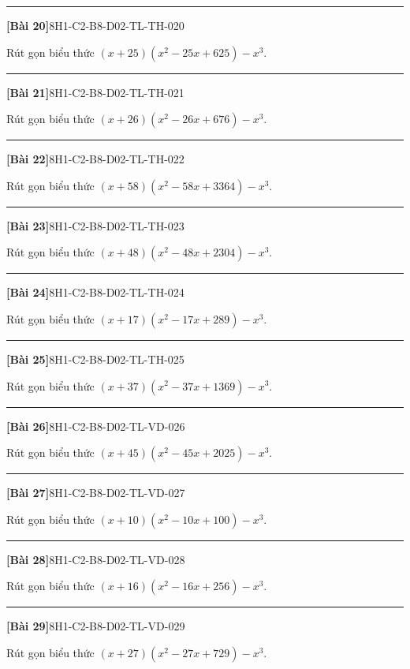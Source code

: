 \documentclass[12pt,a4paper]{article}
\newif\ifloigiai
\newenvironment{cauhoi}[2]{%
  \par\medskip\noindent\rule{\textwidth}{0.4pt}\par\nopagebreak
  \noindent\textbf{[#1]}\hfill{\scriptsize\ttfamily #2}\par\nopagebreak\smallskip}{\par}
\newcommand{\loigiai}[1]{\ifloigiai\par\smallskip\noindent\textit{Lời giải.} #1\par\fi}
\begin{document}
\begin{cauhoi}{Bài 20}{8H1-C2-B8-D02-TL-TH-020}
Rút gọn biểu thức $(x+25)(x^{2}-25x+625)-x^{3}$.
\loigiai{Ta có $(x+25)(x^{2}-25x+625)=x^{3}+15625$ nên biểu thức bằng $x^{3}+15625-x^{3}=15625$.}
\end{cauhoi}
\begin{cauhoi}{Bài 21}{8H1-C2-B8-D02-TL-TH-021}
Rút gọn biểu thức $(x+26)(x^{2}-26x+676)-x^{3}$.
\loigiai{Ta có $(x+26)(x^{2}-26x+676)=x^{3}+17576$ nên biểu thức bằng $x^{3}+17576-x^{3}=17576$.}
\end{cauhoi}
\begin{cauhoi}{Bài 22}{8H1-C2-B8-D02-TL-TH-022}
Rút gọn biểu thức $(x+58)(x^{2}-58x+3364)-x^{3}$.
\loigiai{Ta có $(x+58)(x^{2}-58x+3364)=x^{3}+195112$ nên biểu thức bằng $x^{3}+195112-x^{3}=195112$.}
\end{cauhoi}
\begin{cauhoi}{Bài 23}{8H1-C2-B8-D02-TL-TH-023}
Rút gọn biểu thức $(x+48)(x^{2}-48x+2304)-x^{3}$.
\loigiai{Ta có $(x+48)(x^{2}-48x+2304)=x^{3}+110592$ nên biểu thức bằng $x^{3}+110592-x^{3}=110592$.}
\end{cauhoi}
\begin{cauhoi}{Bài 24}{8H1-C2-B8-D02-TL-TH-024}
Rút gọn biểu thức $(x+17)(x^{2}-17x+289)-x^{3}$.
\loigiai{Ta có $(x+17)(x^{2}-17x+289)=x^{3}+4913$ nên biểu thức bằng $x^{3}+4913-x^{3}=4913$.}
\end{cauhoi}
\begin{cauhoi}{Bài 25}{8H1-C2-B8-D02-TL-TH-025}
Rút gọn biểu thức $(x+37)(x^{2}-37x+1369)-x^{3}$.
\loigiai{Ta có $(x+37)(x^{2}-37x+1369)=x^{3}+50653$ nên biểu thức bằng $x^{3}+50653-x^{3}=50653$.}
\end{cauhoi}
\begin{cauhoi}{Bài 26}{8H1-C2-B8-D02-TL-VD-026}
Rút gọn biểu thức $(x+45)(x^{2}-45x+2025)-x^{3}$.
\loigiai{Ta có $(x+45)(x^{2}-45x+2025)=x^{3}+91125$ nên biểu thức bằng $x^{3}+91125-x^{3}=91125$.}
\end{cauhoi}
\begin{cauhoi}{Bài 27}{8H1-C2-B8-D02-TL-VD-027}
Rút gọn biểu thức $(x+10)(x^{2}-10x+100)-x^{3}$.
\loigiai{Ta có $(x+10)(x^{2}-10x+100)=x^{3}+1000$ nên biểu thức bằng $x^{3}+1000-x^{3}=1000$.}
\end{cauhoi}
\begin{cauhoi}{Bài 28}{8H1-C2-B8-D02-TL-VD-028}
Rút gọn biểu thức $(x+16)(x^{2}-16x+256)-x^{3}$.
\loigiai{Ta có $(x+16)(x^{2}-16x+256)=x^{3}+4096$ nên biểu thức bằng $x^{3}+4096-x^{3}=4096$.}
\end{cauhoi}
\begin{cauhoi}{Bài 29}{8H1-C2-B8-D02-TL-VD-029}
Rút gọn biểu thức $(x+27)(x^{2}-27x+729)-x^{3}$.
\loigiai{Ta có $(x+27)(x^{2}-27x+729)=x^{3}+19683$ nên biểu thức bằng $x^{3}+19683-x^{3}=19683$.}
\end{cauhoi}
\end{document}
